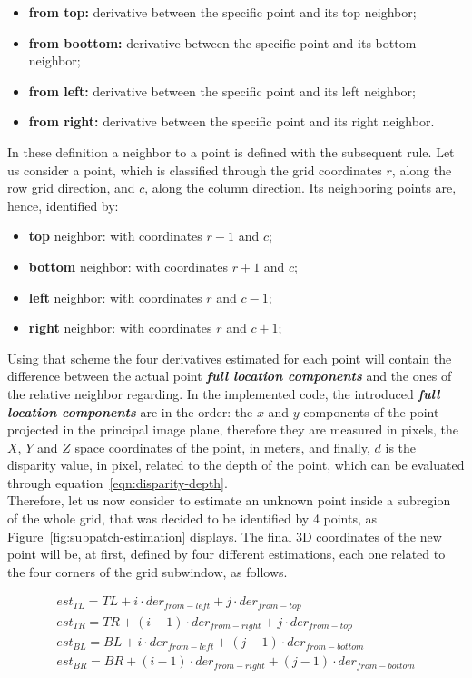 \begin{itemize}
	\item \textbf{from top:} derivative between the specific point and its top neighbor;
	\item \textbf{from boottom:} derivative between the specific point and its bottom neighbor;
	\item \textbf{from left:} derivative between the specific point and its left neighbor;
	\item \textbf{from right:} derivative between the specific point and its right neighbor.
\end{itemize}
In these definition a neighbor to a point is defined with the subsequent rule. 
Let us consider a point, which is classified through the grid coordinates $r$, along the row grid direction, and  $c$, along the column direction. 
Its neighboring points are, hence, identified by:
\begin{itemize}
	\item \textbf{top} neighbor: with coordinates $r - 1$ and $c$;
	\item \textbf{bottom} neighbor: with coordinates $r + 1$ and $c$;
	\item \textbf{left} neighbor: with coordinates $r$ and $c - 1$;
	\item \textbf{right} neighbor: with coordinates $r$ and $c + 1$;
\end{itemize}
Using that scheme the four derivatives estimated for each point will contain the difference between the actual point  \textbf{\textit{full location components}} and the ones of the relative neighbor regarding.
In the implemented code, the introduced \textbf{\textit{full location components}} are in the order: the $x$ and $y$ components of the point projected in the principal image plane, therefore they are measured in pixels, the $X$, $Y$ and $Z$ space coordinates of the point, in meters, and finally, $d$ is the disparity value, in pixel, related to the depth of the point, which can be evaluated through equation~\ref{eqn:disparity-depth}.\\
Therefore, let us now consider to estimate an unknown point inside a subregion of the whole grid, that was decided to be identified by 4 points, as Figure~\ref{fig:subpatch-estimation} displays.
The final 3D coordinates of the new point will be, at first, defined by four different estimations, each one related to the four corners of the grid subwindow, as follows.

\begin{subequations}
\label{eqn:point-patch-estimation}
	\begin{align}
		est_{TL} = TL + i \cdot der_{from-left} + j \cdot der_{from-top} \\
		est_{TR} = TR + (i-1) \cdot der_{from-right} + j \cdot der_{from-top} \\
		est_{BL} = BL + i \cdot der_{from-left} + (j-1) \cdot der_{from-bottom} \\
		est_{BR} = BR + (i-1) \cdot der_{from-right} + (j-1) \cdot der_{from-bottom}
	\end{align}
\end{subequations}

